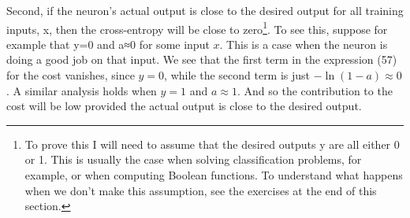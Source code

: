 \documentclass[a4paper,twoside,10pt]{book}
\begin{document}
Second, if the neuron's actual output is close to the desired output for all training inputs, x, then the cross-entropy will be close to zero\footnote{To prove this I will need to assume that the desired outputs y are all either 0 or 1. This is usually the case when solving classification problems, for example, or when computing Boolean functions. To understand what happens when we don't make this assumption, see the exercises at the end of this section.}. To see this, suppose for example that y=0 and a≈0 for some input $x$. This is a case when the neuron is doing a good job on that input. We see that the first term in the expression (57) for the cost vanishes, since $y=0$, while the second term is just $-\ln(1-a)\approx0$. A similar analysis holds when $y=1$ and $a\approx1$. And so the contribution to the cost will be low provided the actual output is close to the desired output.
\end{document}
